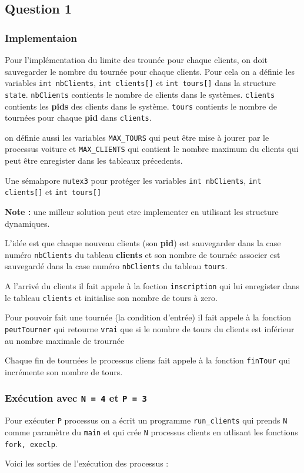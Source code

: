 \subsection{Question 1}
\subsubsection{Implementaion}
Pour l'implémentation du limite des trounée pour chaque clients, on doit
sauvegarder le nombre du tournée pour chaque clients. Pour cela on a définie les
variables \texttt{int nbClients}, \texttt{int clients[]} et \texttt{int
  tours[]} dans la structure \texttt{state}.
\texttt{nbClients} contients le nombre de clients dans le systèmes.
\texttt{clients} contients les \textbf{pids} des clients dans le système.
\texttt{tours} contients le nombre de tournées pour chaque \textbf{pid} dans
\texttt{clients}.

on définie aussi les variables \texttt{MAX_TOURS} qui peut être mise à jourer
par le processus voiture et \texttt{MAX_CLIENTS} qui contient le nombre maximum
du clients qui peut être enregister dans les tableaux précedents.

Une sémahpore \texttt{mutex3} pour protéger les variables \texttt{int nbClients}, \texttt{int clients[]} et \texttt{int
  tours[]}

\textbf{Note :} une milleur solution peut etre implementer en utilisant les structure
dynamiques.

L'idée est que chaque nouveau clients (son \textbf{pid}) est sauvegarder dans la
case numéro \texttt{nbClients} du tableau \textbf{clients} et son nombre de
tournée associer est sauvegardé dans la case numéro \texttt{nbClients} du
tableau \texttt{tours}.

A l'arrivé du clients il fait appele à la foction \texttt{inscription} qui lui
enregister dans le tableau \texttt{clients} et initialise son nombre de tours à zero.

Pour pouvoir fait une tournée (la condition d'entrée) il fait appele à la
fonction  \texttt{peutTourner} qui retourne \texttt{vrai} que si le nombre de
tours du clients est inférieur au nombre maximale de trournée

Chaque fin de tournées le processus cliens fait appele à la fonction
\texttt{finTour} qui incrémente son nombre de tours.

\subsubsection{Exécution avec \texttt{N = 4} et \texttt{P = 3}}
Pour exécuter \texttt{P} processus on a écrit un programme \texttt{run\_clients}
qui prends \texttt{N} comme  paramètre du \texttt{main} et qui crée \texttt{N}
processus clients en utlisant les fonctions \texttt{fork, execlp}.

Voici les sorties de l'exécution des processus :

%
%


